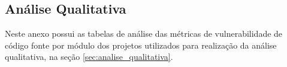 \begin{anexosenv}
\chapter{Análise Qualitativa} \label{anex:analise_qualitativa}

Neste anexo possui as tabelas de análise das métricas de vulnerabilidade de código fonte por módulo
dos projetos utilizados para realização da análise qualitativa, na seção \ref{sec:analise_qualitativa}.


\begin{table}[h]
\caption{Projeto Bash}
\end{table}




\end{anexosenv}

